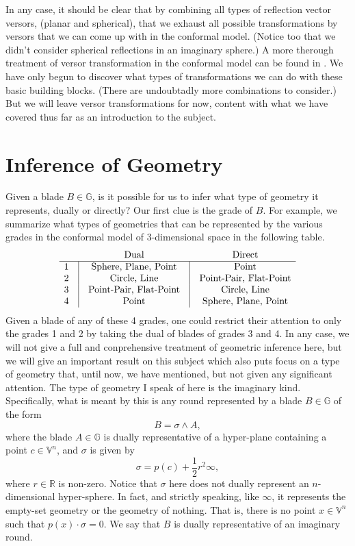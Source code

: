 \documentclass[12pt]{article}
\newcommand{\G}{\mathbb{G}}
\newcommand{\V}{\mathbb{V}}
\newcommand{\R}{\mathbb{R}}
\newcommand{\nvai}{\infty}
\begin{document}
In any case, it should be clear that by combining all types of reflection vector versors, (planar and spherical),
that we exhaust all possible transformations by versors that we can come up with in the
conformal model.  (Notice too that we didn't consider spherical reflections in an imaginary sphere.)
A more therough treatment of versor transformation in the conformal model can be found in
\cite{dorst07}.
We have only begun to discover what types of transformations we
can do with these basic building blocks.  (There are undoubtadly more combinations to
consider.)  But we will leave versor transformations for now, content with what we have
covered thus far as an introduction to the subject.

\section{Inference of Geometry}

Given a blade $B\in\G$, is it possible for us to infer what type of geometry it
represents, dually or directly?  Our first clue is the grade of $B$.
For example, we summarize what types of geometries that can be represented by the various
grades in the conformal model of 3-dimensional space in the following table.
\begin{equation*}
\begin{array}{ccccc}
 &  & \mbox{Dual} & & \mbox{Direct} \\
\hline
1 & \vline & \mbox{Sphere, Plane, Point} & \vline & \mbox{Point} \\
2 & \vline & \mbox{Circle, Line} & \vline & \mbox{Point-Pair, Flat-Point} \\
3 & \vline & \mbox{Point-Pair, Flat-Point} & \vline & \mbox{Circle, Line} \\
4 & \vline & \mbox{Point} & \vline & \mbox{Sphere, Plane, Point}
\end{array}
\end{equation*}
Given a blade of any of these 4 grades, one could restrict their attention to
only the grades 1 and 2 by taking the dual of blades of grades 3 and 4.
In any case, we will not give a full and conprehensive treatment of
geometric inference here, but we will give an important result on this subject
which also puts focus on a type of geometry that, until now, we have
mentioned, but not given any significant attention.  
The type of geometry I speak of here is the imaginary kind.
Specifically, what is meant by this is any round represented by
a blade $B\in\G$ of the form
\begin{equation*}
B = \sigma\wedge A,
\end{equation*}
where the blade $A\in\G$ is dually representative of a hyper-plane containing
a point $c\in\V^n$, and $\sigma$ is given by
\begin{equation*}
\sigma = p(c) + \frac{1}{2}r^2\nvai,
\end{equation*}
where $r\in\R$ is non-zero.  Notice that $\sigma$ here does not dually
represent an $n$-dimensional hyper-sphere.  In fact, and strictly speaking,
like $\nvai$, it represents the empty-set geometry or the geometry of nothing.
That is, there is no point $x\in\V^n$ such that $p(x)\cdot\sigma = 0$.  We say
that $B$ is dually representative of an imaginary round.
\end{document}
